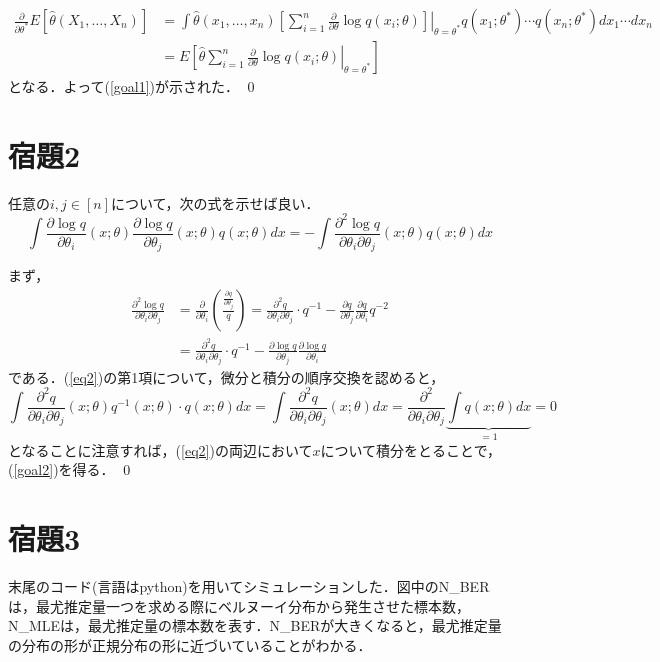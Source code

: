 \documentclass[11pt,a4paper,dvipdfmx]{article}
\theoremstyle{plain}
\renewcommand{\hat}{\widehat}
\newcommand{\1}{\mbox{1}\hspace{-0.25em}\mbox{l}}
\begin{document}
\begin{align*}
\frac{\partial}{\partial \theta^*} E[\hat{\theta}(X_1, \dots, X_n)]
&=
\int \hat{\theta}(x_1, \dots, x_n)
	\left.
	\left[
	\sum_{i=1}^n \frac{\partial}{\partial \theta} \log q(x_i; \theta)
	\right]
	\right|_{\theta = \theta^*}
	q(x_1; \theta^*) \cdots q(x_n; \theta^*)
	dx_1 \cdots dx_n \\
&= E \left. \left[ \hat{\theta} \sum_{i=1}^n \frac{\partial}{\partial \theta} \log q(x_i; \theta) \right|_{\theta = \theta^*} \right]
\end{align*}
となる．よって(\ref{goal1})が示された．
\qed


\newpage
\section*{宿題2}
任意の$i, j \in [n]$について，次の式を示せば良い．
\begin{equation} \label{goal2}
	\int
	\frac{\partial \log q}{\partial \theta_i}(x; \theta)
	\frac{\partial \log q}{\partial \theta_j}(x; \theta)
	q(x; \theta) dx
	=
	- \int \frac{\partial^2 \log q}{\partial \theta_i \partial \theta_j}(x; \theta)
	q(x; \theta) dx
\end{equation}

まず，
\begin{align}
	\frac{\partial^2 \log q}{\partial \theta_i \partial \theta_j}
	&= 
	\frac{\partial }{\partial \theta_i}
	\left(
	\frac{\frac{\partial q}{\partial \theta_j}}{q}
	\right)
	=
	\frac{\partial^2 q}{\partial \theta_i \partial \theta_j} \cdot q^{-1}
	-
	\frac{\partial q}{\partial \theta_j} \frac{\partial q}{\partial \theta_i}q^{-2} \nonumber \\
	&=
	\frac{\partial^2 q}{\partial \theta_i \partial \theta_j} \cdot q^{-1}
	-
	\frac{\partial \log q}{\partial \theta_j} \frac{\partial \log q}{\partial \theta_i} \label{eq2}
\end{align}
である．(\ref{eq2})の第1項について，微分と積分の順序交換を認めると，
$$
\int \frac{\partial^2 q}{\partial \theta_i \partial \theta_j}(x; \theta) q^{-1}(x; \theta) \cdot q(x; \theta) dx
=
\int \frac{\partial^2 q}{\partial \theta_i \partial \theta_j}(x; \theta) dx
= \frac{\partial^2}{\partial \theta_i \partial \theta_j} 
\underbrace{\int q(x; \theta) dx}_{=1}
= 0
$$
となることに注意すれば，(\ref{eq2})の両辺において$x$について積分をとることで，(\ref{goal2})を得る．
\qed



\section*{宿題3}
末尾のコード(言語はpython)を用いてシミュレーションした．図中のN\_BERは，最尤推定量一つを求める際にベルヌーイ分布から発生させた標本数，N\_MLEは，最尤推定量の標本数を表す．N\_BERが大きくなると，最尤推定量の分布の形が正規分布の形に近づいていることがわかる．
\end{document}
